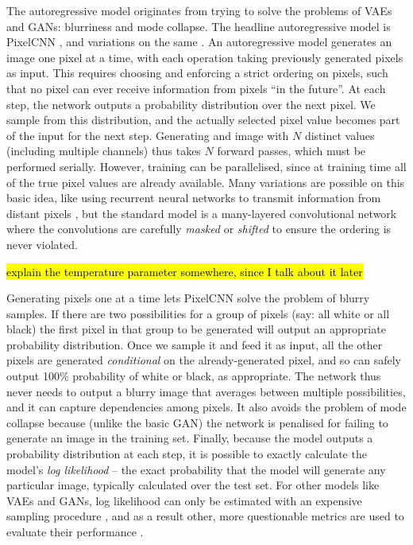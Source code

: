 \documentclass[10pt,a4paper]{article}
\newcommand{\nquote}[1]{``{#1}''}
\begin{document}
The autoregressive model originates from trying to solve the problems of VAEs and GANs: blurriness and mode collapse. The headline autoregressive model is PixelCNN \cite{pixelcnn2}, and variations on the same \cite{pixelcnn3,pixelcnn++,superres,wavenet,bytenet,videopixel}. An autoregressive model generates an image one pixel at a time, with each operation taking previously generated pixels as input. This requires choosing and enforcing a strict ordering on pixels, such that no pixel can ever receive information from pixels \nquote{in the future}. At each step, the network outputs a probability distribution over the next pixel. We sample from this distribution, and the actually selected pixel value becomes part of the input for the next step. Generating and image with $N$ distinct values (including multiple channels) thus takes $N$ forward passes, which must be performed serially. However, training can be parallelised, since at training time all of the true pixel values are already available. Many variations are possible on this basic idea, like using recurrent neural networks to transmit information from distant pixels \cite{pixelcnn1}, but the standard model is a many-layered convolutional network where the convolutions are carefully \emph{masked} \cite{pixelcnn2} or \emph{shifted} \cite{pixelcnn++} to ensure the ordering is never violated.

\hl{explain the temperature parameter somewhere, since I talk about it later}

Generating pixels one at a time lets PixelCNN solve the problem of blurry samples. If there are two possibilities for a group of pixels (say: all white or all black) the first pixel in that group to be generated will output an appropriate probability distribution. Once we sample it and feed it as input, all the other pixels are generated \emph{conditional} on the already-generated pixel, and so can safely output 100\% probability of white or black, as appropriate. The network thus never needs to output a blurry image that averages between multiple possibilities, and it can capture dependencies among pixels. It also avoids the problem of mode collapse because (unlike the basic GAN) the network is penalised for failing to generate an image in the training set. Finally, because the model outputs a probability distribution at each step, it is possible to exactly calculate the model's \emph{log likelihood} \cite{??} -- the exact probability that the model will generate any particular image, typically calculated over the test set. For other models like VAEs and GANs, log likelihood can only be estimated with an expensive sampling procedure \cite{likelihoodestimation}, and as a result other, more questionable metrics are used to evaluate their performance \cite{??}.
\end{document}

